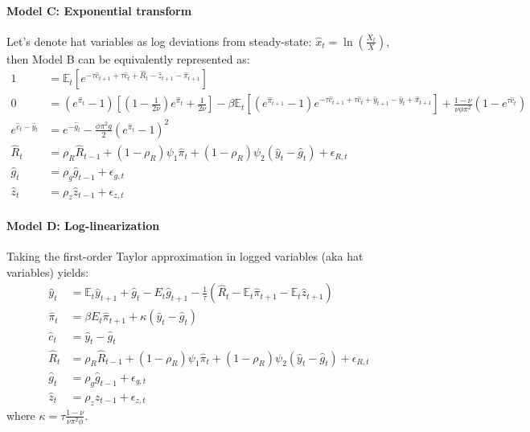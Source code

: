\paragraph{Model C: Exponential transform}
Let's denote hat variables as log deviations from steady-state: $\hat{x}_t = \ln\left(\frac{X_t}{X}\right)$, then Model B can be equivalently represented as:
\begin{align}
1 &= \mathbb{E}_t \left[e^{-\tau \hat{c}_{t+1} + \tau \hat{c}_{t} + \hat{R}_{t} - \hat{z}_{t+1} - \hat{\pi}_{t+1} }\right]\label{eq:AS_C1}
\\
0 &= \left(e^{\hat{\pi}_{t}}-1\right) \left[\left(1-\frac{1}{2\nu}\right)e^{\hat{\pi}_{t}} + \frac{1}{2\nu}\right] - \beta \mathbb{E}_t \left[\left(e^{\hat{\pi}_{t+1}}-1 \right) e^{-\tau \hat{c}_{t+1} + \tau \hat{c}_{t} + \hat{y}_{t+1} - \hat{y}_{t} + \hat{\pi}_{t+1}}\right] + \frac{1-\nu}{\nu\phi\pi^2}\left(1-e^{\tau\hat{c}_{t}}\right)
\\
e^{\hat{c}_{t}-\hat{y}_{t}} &= e^{-\hat{g}_{t}} - \frac{\phi \pi^2 g}{2} \left(e^{\hat{\pi}_{t}}-1\right)^2\label{eq:AS_C3}
\\
\hat{R}_{t} &= \rho_R \hat{R}_{t-1} + (1-\rho_R) \psi_1 \hat{\pi}_{t} + (1-\rho_R)\psi_2(\hat{y}_{t}-\hat{g}_{t}) + \epsilon_{R,t}
\\
\hat{g}_{t} &= \rho_g \hat{g}_{t-1} + \epsilon_{g,t}
\\
\hat{z}_{t} &= \rho_z \hat{z}_{t-1} + \epsilon_{z,t}
\end{align}

\paragraph{Model D: Log-linearization}
Taking the first-order Taylor approximation in logged variables (aka hat variables) yields:
\begin{align}
\hat{y}_{t} &= \mathbb{E}_t \hat{y}_{t+1} + \hat{g}_{t} - E_t\hat{g}_{t+1} - \frac{1}{\tau} \left(\hat{R}_{t}- \mathbb{E}_t \hat{\pi}_{t+1} - \mathbb{E}_t \hat{z}_{t+1}\right) \label{eq:AS_D1}
\\
\hat{\pi}_{t} &= \beta E_t\hat{\pi}_{t+1} + \kappa \left(\hat{y}_{t} - \hat{g}_{t}\right)
\\
\hat{c}_{t} &= \hat{y}_{t} - \hat{g}_{t}
\\
\hat{R}_{t} &= \rho_R \hat{R}_{t-1} + (1-\rho_R) \psi_1 \hat{\pi}_{t} + (1-\rho_R)\psi_2(\hat{y}_{t}-\hat{g}_{t}) + \epsilon_{R,t}
\\
\hat{g}_{t} &= \rho_g \hat{g}_{t-1} + \epsilon_{g,t}
\\
\hat{z}_{t} &= \rho_z \hat{z}_{t-1} + \epsilon_{z,t}
\end{align}
where $\kappa=\tau\frac{1-\nu}{\nu\pi^2\phi}$.

